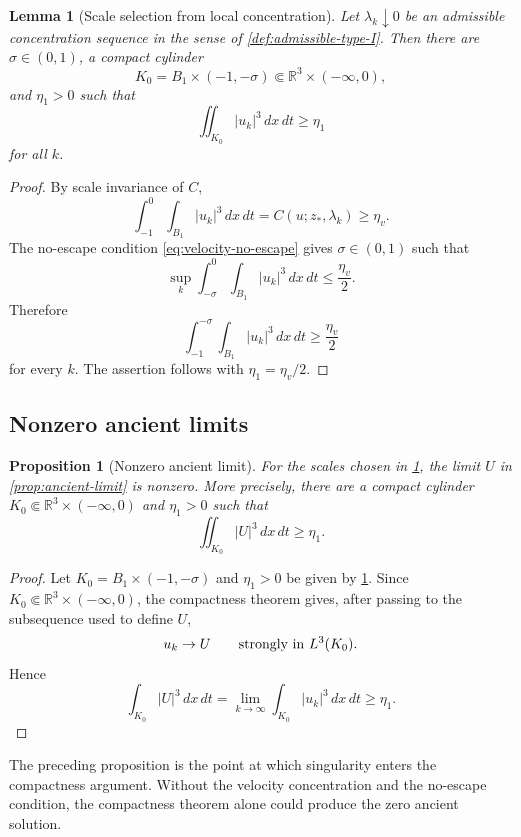 \documentclass[11pt]{amsart}
\theoremstyle{plain}
\newtheorem{proposition}[theorem]{Proposition}
\newtheorem{lemma}[theorem]{Lemma}
\theoremstyle{definition}
\theoremstyle{remark}
\numberwithin{equation}{section}
\newcommand{\R}{\mathbb R}
\begin{document}
\begin{lemma}[Scale selection from local concentration]\label{lem:scale-selection}
Let \(\lambda_k\downarrow0\) be an admissible concentration sequence in the
sense of \cref{def:admissible-type-I}.  Then there are
\(\sigma\in(0,1)\), a compact cylinder
\[
   K_0=B_1\times(-1,-\sigma)\Subset\R^3\times(-\infty,0),
\]
and \(\eta_1>0\) such that
\begin{equation}\label{eq:selected-lower-bound}
   \iint_{K_0}|u_k|^3\,dx\,dt\ge\eta_1
\end{equation}
for all \(k\).
\end{lemma}

\begin{proof}
By scale invariance of \(C\),
\[
   \int_{-1}^{0}\int_{B_1}|u_k|^3\,dx\,dt
   =
   C(u;z_*,\lambda_k)\ge\eta_v .
\]
The no-escape condition \eqref{eq:velocity-no-escape} gives
\(\sigma\in(0,1)\) such that
\[
   \sup_k\int_{-\sigma}^{0}\int_{B_1}|u_k|^3\,dx\,dt
   \le \frac{\eta_v}{2}.
\]
Therefore
\[
   \int_{-1}^{-\sigma}\int_{B_1}|u_k|^3\,dx\,dt
   \ge \frac{\eta_v}{2}
\]
for every \(k\).  The assertion follows with
\(\eta_1=\eta_v/2\).
\end{proof}

\subsection{Nonzero ancient limits}

\begin{proposition}[Nonzero ancient limit]\label{prop:nonzero}
For the scales chosen in \cref{lem:scale-selection}, the limit \(U\) in
\cref{prop:ancient-limit} is nonzero.  More precisely, there are a compact
cylinder \(K_0\Subset\R^3\times(-\infty,0)\) and \(\eta_1>0\) such that
\[
   \iint_{K_0}|U|^3\,dx\,dt\ge\eta_1 .
\]
\end{proposition}

\begin{proof}
Let \(K_0=B_1\times(-1,-\sigma)\) and \(\eta_1>0\) be given by
\cref{lem:scale-selection}.  Since
\(K_0\Subset\R^3\times(-\infty,0)\), the compactness theorem gives, after
passing to the subsequence used to define \(U\),
\[
   u_k\to U\qquad\hbox{strongly in }L^3(K_0).
\]
Hence
\[
   \int_{K_0}|U|^3\,dx\,dt
   =
   \lim_{k\to\infty}\int_{K_0}|u_k|^3\,dx\,dt
   \ge\eta_1 .
\]
\end{proof}

The preceding proposition is the point at which singularity enters the
compactness argument.  Without the velocity concentration and the
no-escape condition, the compactness theorem alone could produce the zero
ancient solution.
\end{document}
